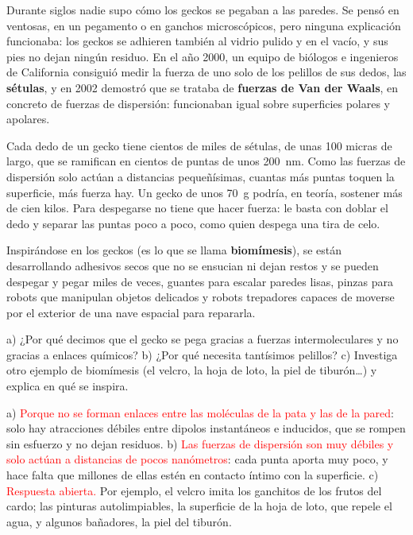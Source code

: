 Durante siglos nadie supo cómo los geckos se pegaban a las paredes. Se pensó en ventosas, en un pegamento o en ganchos
microscópicos, pero ninguna explicación funcionaba: los geckos se adhieren también al vidrio pulido y en el vacío, y sus pies no
dejan ningún residuo. En el año 2000, un equipo de biólogos e ingenieros de California consiguió medir la fuerza de uno solo de
los pelillos de sus dedos, las \textbf{sétulas}, y en 2002 demostró que se trataba de \textbf{fuerzas de Van der Waals}, en
concreto de fuerzas de dispersión: funcionaban igual sobre superficies polares y apolares.

Cada dedo de un gecko tiene cientos de miles de sétulas, de unas 100 micras de largo, que se ramifican en cientos de puntas de
unos \qty{200}{\nm}. Como las fuerzas de dispersión solo actúan a distancias pequeñísimas, cuantas más puntas toquen la
superficie, más fuerza hay. Un gecko de unos \qty{70}{\gram} podría, en teoría, sostener más de cien kilos. Para despegarse no
tiene que hacer fuerza: le basta con doblar el dedo y separar las puntas poco a poco, como quien despega una tira de celo.

Inspirándose en los geckos (es lo que se llama \textbf{biomímesis}), se están desarrollando adhesivos secos que no se ensucian ni
dejan restos y se pueden despegar y pegar miles de veces, guantes para escalar paredes lisas, pinzas para robots que manipulan
objetos delicados y robots trepadores capaces de moverse por el exterior de una nave espacial para repararla.

\begin{exercise}
    a) ¿Por qué decimos que el gecko se pega gracias a fuerzas intermoleculares y no gracias a enlaces químicos? b) ¿Por qué
    necesita tantísimos pelillos? c) Investiga otro ejemplo de biomímesis (el velcro, la hoja de loto, la piel de tiburón…) y
    explica en qué se inspira.
    \begin{solu}
        a) \textcolor{red}{Porque no se forman enlaces entre las moléculas de la pata y las de la pared}: solo hay atracciones
        débiles entre dipolos instantáneos e inducidos, que se rompen sin esfuerzo y no dejan residuos. b) \textcolor{red}{Las
        fuerzas de dispersión son muy débiles y solo actúan a distancias de pocos nanómetros}: cada punta aporta muy poco, y hace
        falta que millones de ellas estén en contacto íntimo con la superficie. c) \textcolor{red}{Respuesta abierta.} Por
        ejemplo, el velcro imita los ganchitos de los frutos del cardo; las pinturas autolimpiables, la superficie de la hoja de
        loto, que repele el agua, y algunos bañadores, la piel del tiburón.
    \end{solu}
\end{exercise}

